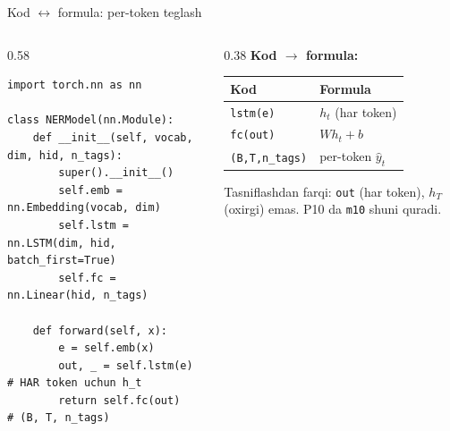 \documentclass[aspectratio=169,11pt]{beamer}
\begin{document}
\begin{frame}[fragile]{Kod $\leftrightarrow$ formula: per-token teglash}
  \begin{columns}[T]
    \begin{column}{0.58\textwidth}
\begin{lstlisting}
import torch.nn as nn

class NERModel(nn.Module):
    def __init__(self, vocab, dim, hid, n_tags):
        super().__init__()
        self.emb = nn.Embedding(vocab, dim)
        self.lstm = nn.LSTM(dim, hid, batch_first=True)
        self.fc = nn.Linear(hid, n_tags)

    def forward(self, x):
        e = self.emb(x)
        out, _ = self.lstm(e)        # HAR token uchun h_t
        return self.fc(out)          # (B, T, n_tags)
\end{lstlisting}
    \end{column}
    \begin{column}{0.38\textwidth}
      \textbf{Kod $\to$ formula:}\\[3pt]
      \footnotesize
      \begin{tabular}{p{1.7cm}p{1.9cm}}
        \toprule
        Kod & Formula \\
        \midrule
        \texttt{lstm(e)} & $h_t$ (har token) \\
        \texttt{fc(out)} & $W h_t + b$ \\
        \texttt{(B,T,n\_tags)} & per-token $\hat{y}_t$ \\
        \bottomrule
      \end{tabular}
      \vspace{4pt}
      \begin{tcolorbox}[okbox,top=2pt,bottom=2pt]
        \footnotesize
        Tasniflashdan farqi: \texttt{out} (har token), $h_T$ (oxirgi) emas.
        P10 da \texttt{m10} shuni quradi.
      \end{tcolorbox}
    \end{column}
  \end{columns}
\end{frame}
\end{document}
